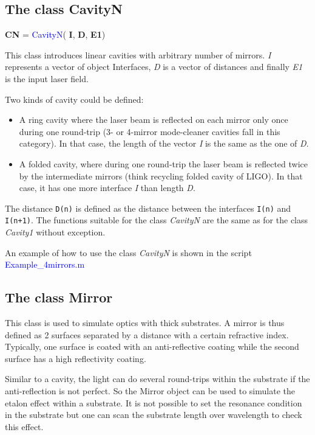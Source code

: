 \subsection{The class CavityN}

\textbf{CN} = \textcolor{blue}{CavityN}( \textbf{I}, \textbf{D}, \textbf{E1})

This class introduces linear cavities with arbitrary number of mirrors. \textsl{I} represents a vector of object Interfaces, \textsl{D} is a vector of distances and finally \textsl{E1} is the input laser field.

Two kinds of cavity could be defined:
\begin{itemize}
  \item A ring cavity where the laser beam is reflected on each mirror only once during one round-trip (3- or 4-mirror mode-cleaner cavities fall in this category). In that case, the length of the vector \textsl{I} is the same as the one of \textsl{D}.
  \item A folded cavity, where during one round-trip the laser beam is reflected twice by the intermediate mirrors (think recycling folded cavity of LIGO). In that case, it has one more interface \textsl{I} than length \textsl{D}.
\end{itemize}


The distance  \verb|D(n)| is defined as the distance between the interfaces  \verb|I(n)| and  \verb|I(n+1)|. The functions suitable for the class \textsl{CavityN} are the same as for the class \textsl{Cavity1} without exception.

An example of how to use the class \textsl{CavityN} is shown in the script \textcolor{blue}{Example\_4mirrors.m}

\subsection{The class Mirror}

This class is used to simulate optics with thick substrates. A mirror is thus defined as 2 surfaces separated by a distance with a certain refractive index. Typically, one surface is coated with an anti-reflective coating while the second surface has a high reflectivity coating.

Similar to a cavity, the light can do several round-trips within the substrate if the anti-reflection is not perfect. So the Mirror object can be used to simulate the etalon effect within a substrate. It is not possible to set the resonance condition in the substrate but one can scan the substrate length over wavelength to check this effect.

